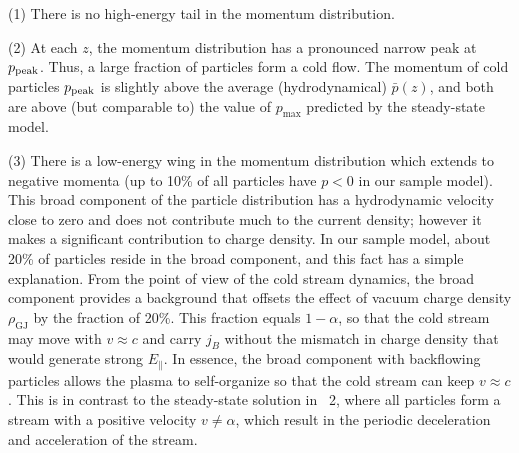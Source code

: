 (1) There is no high-energy tail in the momentum distribution.

(2) At each $z$, the momentum distribution has a pronounced narrow peak at
$p_{\rm peak}$. Thus, a large fraction of particles form a cold flow.
The momentum of cold particles
$p_{\rm peak}$ is slightly above the average (hydrodynamical) $\bar{p}(z)$, and
both are above (but comparable to) the value of $p_{\max}$ predicted by the
steady-state model.

(3) There is a low-energy wing in the momentum distribution which extends to
negative momenta (up to 10\% of all particles have $p<0$ in our sample model).
This broad component of the particle distribution has a
hydrodynamic velocity close to zero and does not contribute much to the
current density; however it makes a significant contribution to charge density.
In our sample model, about 20\% of particles reside in the broad component,
and this fact has a simple explanation. From the point of view of the cold stream
dynamics, the broad component provides a background that offsets the effect
of vacuum charge density $\rho_\mathrm{GJ}$ by the fraction of 20\%. This fraction
equals $1-\alpha$, so that the cold
stream may move with $v\approx c$ and carry $j_B$ without the mismatch in
charge density that would generate strong $E_\parallel$. In essence, the broad
component with backflowing particles allows the plasma to self-organize so that
the cold stream can keep $v\approx c$. This is in contrast to the steady-state
solution in \Sect~2, where all particles form a stream with a positive velocity
$v\neq\alpha$, which result in the periodic deceleration and acceleration of the
stream.


